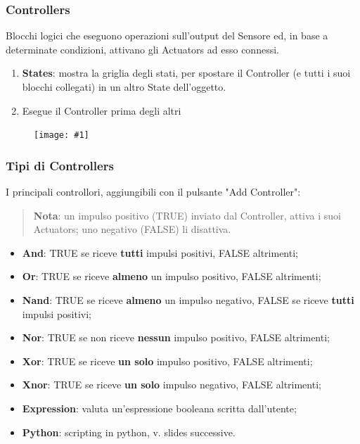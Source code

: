 \documentclass{beamer}
\def\image[#1][#2]{
	\begin{figure}[H]
		\centering
		\texttt{[image: \#1]}
\end{figure}}
\begin{document}
		\begin{frame}
			\frametitle{Controllers} %

			Blocchi logici che \textcolor{BlenderOrange}{eseguono operazioni} sull'output del Sensore ed, in base a determinate condizioni, \textcolor{BlenderOrange}{attivano gli Actuators} ad esso connessi.
			\begin{enumerate}
				\item \textbf{States}: mostra la griglia degli stati, per spostare il Controller (e tutti i suoi blocchi collegati) in un altro State dell'oggetto.
				\item Esegue il Controller prima degli altri
			\end{enumerate}
			\image[images/contr.png][scale=0.3]
		\end{frame}	
		\begin{frame}
			\frametitle{Tipi di Controllers}
			I principali controllori, aggiungibili con il pulsante "Add Controller":
			\begin{quote}
			\textcolor{BlenderOrange}{\textbf{Nota}: un impulso positivo (TRUE) inviato dal Controller, attiva i suoi Actuators; uno negativo (FALSE) li disattiva.}
			\end{quote}
			\begin{itemize}
				\item \textbf{And}: {\footnotesize TRUE se riceve \textbf{tutti} impulsi positivi, FALSE altrimenti;}
				\item \textbf{Or}: {\footnotesize TRUE se riceve \textbf{almeno} un impulso positivo, FALSE altrimenti;}
				\item \textbf{Nand}: {\footnotesize TRUE se riceve \textbf{almeno} un impulso negativo, FALSE se riceve \textbf{tutti} impulsi positivi;}
				\item \textbf{Nor}: {\footnotesize TRUE se non riceve \textbf{nessun} impulso positivo, FALSE altrimenti;}
				\item \textbf{Xor}: {\footnotesize TRUE se riceve \textbf{un solo} impulso positivo, FALSE altrimenti;}
				\item \textbf{Xnor}: {\footnotesize TRUE se riceve \textbf{un solo} impulso negativo, FALSE altrimenti;}
				\item \textbf{Expression}: {\footnotesize valuta un'espressione booleana scritta dall'utente;}
				\item \textbf{Python}: {\footnotesize scripting in python, v. slides successive.}
			\end{itemize}
		\end{frame}
		
\end{document}
